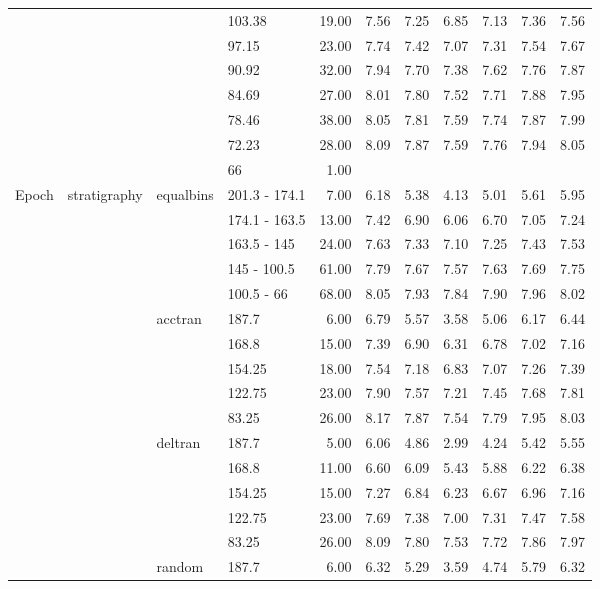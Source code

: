 \begin{longtable}{llllrrrrrrr}
   &  &  & 103.38 & 19.00 & 7.56 & 7.25 & 6.85 & 7.13 & 7.36 & 7.56 \\ 
   &  &  & 97.15 & 23.00 & 7.74 & 7.42 & 7.07 & 7.31 & 7.54 & 7.67 \\ 
   &  &  & 90.92 & 32.00 & 7.94 & 7.70 & 7.38 & 7.62 & 7.76 & 7.87 \\ 
   &  &  & 84.69 & 27.00 & 8.01 & 7.80 & 7.52 & 7.71 & 7.88 & 7.95 \\ 
   &  &  & 78.46 & 38.00 & 8.05 & 7.81 & 7.59 & 7.74 & 7.87 & 7.99 \\ 
   &  &  & 72.23 & 28.00 & 8.09 & 7.87 & 7.59 & 7.76 & 7.94 & 8.05 \\ 
   &  &  & 66 & 1.00 &  &  &  &  &  &  \\ 
  Epoch & stratigraphy & equalbins & 201.3 - 174.1 & 7.00 & 6.18 & 5.38 & 4.13 & 5.01 & 5.61 & 5.95 \\ 
   &  &  & 174.1 - 163.5 & 13.00 & 7.42 & 6.90 & 6.06 & 6.70 & 7.05 & 7.24 \\ 
   &  &  & 163.5 - 145 & 24.00 & 7.63 & 7.33 & 7.10 & 7.25 & 7.43 & 7.53 \\ 
   &  &  & 145 - 100.5 & 61.00 & 7.79 & 7.67 & 7.57 & 7.63 & 7.69 & 7.75 \\ 
   &  &  & 100.5 - 66 & 68.00 & 8.05 & 7.93 & 7.84 & 7.90 & 7.96 & 8.02 \\ 
   &  & acctran & 187.7 & 6.00 & 6.79 & 5.57 & 3.58 & 5.06 & 6.17 & 6.44 \\ 
   &  &  & 168.8 & 15.00 & 7.39 & 6.90 & 6.31 & 6.78 & 7.02 & 7.16 \\ 
   &  &  & 154.25 & 18.00 & 7.54 & 7.18 & 6.83 & 7.07 & 7.26 & 7.39 \\ 
   &  &  & 122.75 & 23.00 & 7.90 & 7.57 & 7.21 & 7.45 & 7.68 & 7.81 \\ 
   &  &  & 83.25 & 26.00 & 8.17 & 7.87 & 7.54 & 7.79 & 7.95 & 8.03 \\ 
   &  & deltran & 187.7 & 5.00 & 6.06 & 4.86 & 2.99 & 4.24 & 5.42 & 5.55 \\ 
   &  &  & 168.8 & 11.00 & 6.60 & 6.09 & 5.43 & 5.88 & 6.22 & 6.38 \\ 
   &  &  & 154.25 & 15.00 & 7.27 & 6.84 & 6.23 & 6.67 & 6.96 & 7.16 \\ 
   &  &  & 122.75 & 23.00 & 7.69 & 7.38 & 7.00 & 7.31 & 7.47 & 7.58 \\ 
   &  &  & 83.25 & 26.00 & 8.09 & 7.80 & 7.53 & 7.72 & 7.86 & 7.97 \\ 
   &  & random & 187.7 & 6.00 & 6.32 & 5.29 & 3.59 & 4.74 & 5.79 & 6.32 \\ 

\end{longtable}

